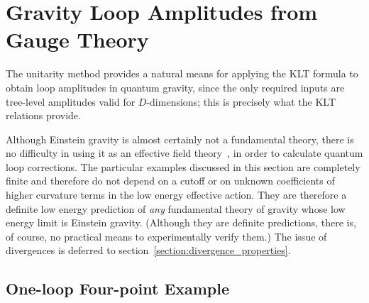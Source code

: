 \documentclass[12pt]{livrev}
\begin{document}
\newpage

\section{Gravity Loop Amplitudes from Gauge Theory}
\label{section:gravity_loops}

The unitarity method provides a natural means for applying the KLT
formula to obtain loop amplitudes in quantum gravity, since the only
required inputs are tree-level amplitudes valid for $D$-dimensions;
this is precisely what the KLT relations provide.

Although Einstein gravity is almost certainly not a fundamental theory,
there is no difficulty in using it as an effective field
theory~\cite{Weinberg79,Gasser85,Donoghue94,Kaplan95,Manohar96}, in
order to calculate quantum loop corrections.  The particular examples
discussed in this section are completely finite and therefore do not
depend on a cutoff or on unknown coefficients of higher curvature
terms in the low energy effective action.  They are therefore a
definite low energy prediction of {\it any} fundamental theory of
gravity whose low energy limit is Einstein gravity.  (Although they
are definite predictions, there is, of course, no practical means to
experimentally verify them.)  The issue of divergences is deferred to
section~\ref{section:divergence_properties}.

\subsection{One-loop Four-point Example}
\end{document}
